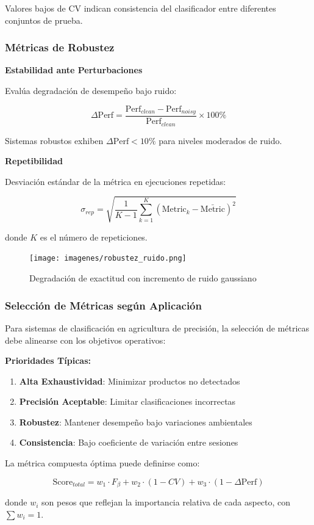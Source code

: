 Valores bajos de CV indican consistencia del clasificador entre diferentes conjuntos de prueba.

\subsubsection{Métricas de Robustez}

\textbf{Estabilidad ante Perturbaciones}

Evalúa degradación de desempeño bajo ruido:

\begin{equation}
\Delta\text{Perf} = \frac{\text{Perf}_{clean} - \text{Perf}_{noisy}}{\text{Perf}_{clean}} \times 100\%
\end{equation}

Sistemas robustos exhiben $\Delta\text{Perf} < 10\%$ para niveles moderados de ruido.

\textbf{Repetibilidad}

Desviación estándar de la métrica en ejecuciones repetidas:

\begin{equation}
\sigma_{rep} = \sqrt{\frac{1}{K-1}\sum_{k=1}^{K}(\text{Metric}_k - \bar{\text{Metric}})^2}
\end{equation}

donde $K$ es el número de repeticiones.

\begin{figure}[h]
\centering
\texttt{[image: imagenes/robustez\_ruido.png]}
\caption{Degradación de exactitud con incremento de ruido gaussiano}
\label{fig:robustez}
\end{figure}

\subsubsection{Selección de Métricas según Aplicación}

Para sistemas de clasificación en agricultura de precisión, la selección de métricas debe alinearse con los objetivos operativos:

\textbf{Prioridades Típicas:}
\begin{enumerate}
\item \textbf{Alta Exhaustividad}: Minimizar productos no detectados
\item \textbf{Precisión Aceptable}: Limitar clasificaciones incorrectas
\item \textbf{Robustez}: Mantener desempeño bajo variaciones ambientales
\item \textbf{Consistencia}: Bajo coeficiente de variación entre sesiones
\end{enumerate}

La métrica compuesta óptima puede definirse como:

\begin{equation}
\text{Score}_{total} = w_1 \cdot F_\beta + w_2 \cdot (1 - CV) + w_3 \cdot (1 - \Delta\text{Perf})
\end{equation}

donde $w_i$ son pesos que reflejan la importancia relativa de cada aspecto, con $\sum w_i = 1$.